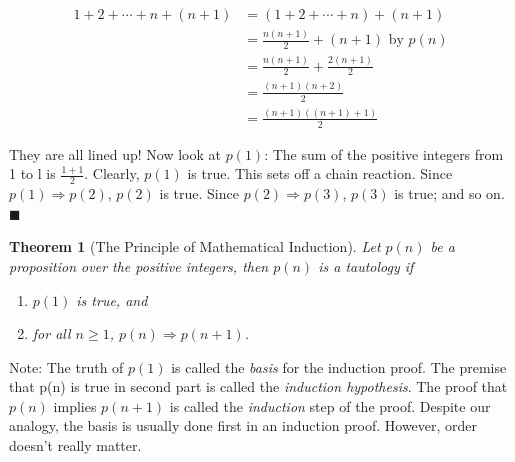 \documentclass[10pt,]{book}
\theoremstyle{plain}
\newtheorem{theorem}{Theorem}[section]
\theoremstyle{definition}
\theoremstyle{definition}
\theoremstyle{definition}
\theoremstyle{definition}
\begin{document}
\begin{equation*}\begin{split}
 1 + 2 + \cdots  + n + (n+1) & = (1 + 2 + \cdots  + n) + (n + 1) \\ 
 & = \frac{ n(n+1)}{2} + (n + 1) \textrm{      by } p(n) \\
 & =  \frac{ n(n+1)}{2}+\frac{2 (n+1)}{2}\\
 & = \frac{  (n+1) (n+2)}{2}  \\
 & = \frac{ (n+1) ((n+1)+1)}{2} 
\end{split}
\end{equation*}%
\par
They are all lined up! Now look at \(p(1)\): The sum of the positive integers from 1 to l is \(\frac{1+1}{2}\). Clearly, \(p(1)\) is true. This sets off a chain reaction. Since \(p(1) \Rightarrow  p(2)\), \(p(2)\) is true. Since \(p(2) \Rightarrow  p(3)\), \(p(3)\) is true; and so on.   \(\blacksquare\)%
\begin{theorem}[The Principle of Mathematical Induction]\label{th-math-induction-basic}
 Let \(p(n)\) be a proposition over the positive integers, then \(p(n)\) is a tautology if%
\par
\leavevmode%
\begin{enumerate}[label=\arabic*]
\item\hypertarget{li-263}{}\(p(1)\) is true, and%
\item\hypertarget{li-264}{}  for all \(n\geq 1\),  \(p(n) \Rightarrow  p(n + 1)\).%
\end{enumerate}
%
\end{theorem}
\par
Note: The truth of \(p(1)\) is called the \emph{basis} for the induction proof. The premise that p(n) is true in second part is called the \emph{induction hypothesis}.  The proof that \(p(n)\) implies \(p(n + 1)\) is called the \emph{induction } step of the proof. Despite our analogy, the basis is usually done first in an induction proof. However, order doesn't really matter.%
\end{document}

